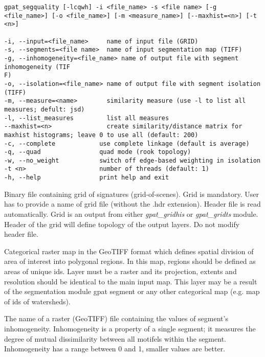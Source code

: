 \begin{minipage}{\linewidth}
\begin{lstlisting}
gpat_segquality [-lcqwh] -i <file_name> -s <file name> [-g <file_name>] [-o <file_name>] [-m <measure_name>] [--maxhist=<n>] [-t <n>]

-i, --input=<file_name>     name of input file (GRID)
-s, --segments=<file name>  name of input segmentation map (TIFF)
-g, --inhomogeneity=<file_name> name of output file with segment inhomogeneity (TIF
F)
-o, --isolation=<file_name> name of output file with segment isolation (TIFF)
-m, --measure=<name>        similarity measure (use -l to list all measures; defult: jsd)
-l, --list_measures         list all measures
--maxhist=<n>               create similarity/distance matrix for maxhist histograms; leave 0 to use all (default: 200)
-c, --complete            use complete linkage (default is average)
-q, --quad                quad mode (rook topology)
-w, --no_weight           switch off edge-based weighting in isolation
-t <n>                    number of threads (default: 1)
-h, --help                print help and exit
\end{lstlisting}
\end{minipage}


Binary file containing grid of signatures (grid-of-scenes). 
Grid is mandatory. 
User has to provide a name of grid file (without the .hdr extension). 
Header file is read automatically. 
Grid is an output from either {\it gpat\_gridhis} or {\it gpat\_gridts} module. 
Header of the grid will define topology of the output layers. 
Do not modify header file.


Categorical raster map in the GeoTIFF format which defines spatial division of area of interest into polygonal regions.
In this map, regions should be defined as areas of unique ids.
Layer must be a raster and its projection, extents and resolution should be identical to the main input map. 
This layer may be a result of the segmentation module gpat segment or any other categorical map (e.g. map of ids of watersheds).


The name of a raster (GeoTIFF) file containing the values of segment's inhomogeneity. 
Inhomogeneity is a property of a single segment; it measures the degree of mutual dissimilarity between all motifels within the segment.
Inhomogeneity has a range between 0 and 1, smaller values are better.

